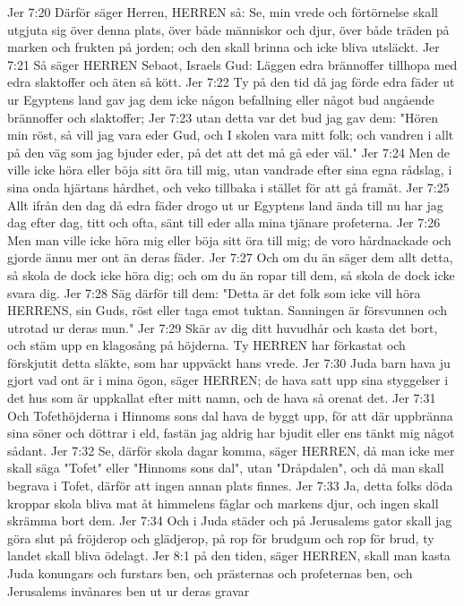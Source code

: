 Jer 7:20  Därför säger Herren, HERREN så: Se, min vrede och förtörnelse skall utgjuta sig över denna plats, över både människor och djur, över både träden på marken och frukten på jorden; och den skall brinna och icke bliva utsläckt.
Jer 7:21  Så säger HERREN Sebaot, Israels Gud: Läggen edra brännoffer tillhopa med edra slaktoffer och äten så kött.
Jer 7:22  Ty på den tid då jag förde edra fäder ut ur Egyptens land gav jag dem icke någon befallning eller något bud angående brännoffer och slaktoffer;
Jer 7:23  utan detta var det bud jag gav dem: "Hören min röst, så vill jag vara eder Gud, och I skolen vara mitt folk; och vandren i allt på den väg som jag bjuder eder, på det att det må gå eder väl."
Jer 7:24  Men de ville icke höra eller böja sitt öra till mig, utan vandrade efter sina egna rådslag, i sina onda hjärtans hårdhet, och veko tillbaka i stället för att gå framåt.
Jer 7:25  Allt ifrån den dag då edra fäder drogo ut ur Egyptens land ända till nu har jag dag efter dag, titt och ofta, sänt till eder alla mina tjänare profeterna.
Jer 7:26  Men man ville icke höra mig eller böja sitt öra till mig; de voro hårdnackade och gjorde ännu mer ont än deras fäder.
Jer 7:27  Och om du än säger dem allt detta, så skola de dock icke höra dig; och om du än ropar till dem, så skola de dock icke svara dig.
Jer 7:28  Säg därför till dem: "Detta är det folk som icke vill höra HERRENS, sin Guds, röst eller taga emot tuktan. Sanningen är försvunnen och utrotad ur deras mun."
Jer 7:29  Skär av dig ditt huvudhår och kasta det bort, och stäm upp en klagosång på höjderna. Ty HERREN har förkastat och förskjutit detta släkte, som har uppväckt hans vrede.
Jer 7:30  Juda barn hava ju gjort vad ont är i mina ögon, säger HERREN; de hava satt upp sina styggelser i det hus som är uppkallat efter mitt namn, och de hava så orenat det.
Jer 7:31  Och Tofethöjderna i Hinnoms sons dal hava de byggt upp, för att där uppbränna sina söner och döttrar i eld, fastän jag aldrig har bjudit eller ens tänkt mig något sådant.
Jer 7:32  Se, därför skola dagar komma, säger HERREN, då man icke mer skall säga "Tofet" eller "Hinnoms sons dal", utan "Dråpdalen", och då man skall begrava i Tofet, därför att ingen annan plats finnes.
Jer 7:33  Ja, detta folks döda kroppar skola bliva mat åt himmelens fåglar och markens djur, och ingen skall skrämma bort dem.
Jer 7:34  Och i Juda städer och på Jerusalems gator skall jag göra slut på fröjderop och glädjerop, på rop för brudgum och rop för brud, ty landet skall bliva ödelagt.
Jer 8:1  på den tiden, säger HERREN, skall man kasta Juda konungars och furstars ben, och prästernas och profeternas ben, och Jerusalems invånares ben ut ur deras gravar
